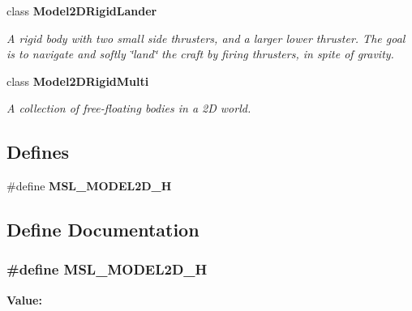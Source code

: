 \begin{CompactItemize}
class {\bf Model2DRigid\-Lander}
\begin{CompactList}\small\item\em A rigid body with two small side thrusters, and a larger lower thruster. The goal is to navigate and softly \char`\"{}land\char`\"{} the craft by firing thrusters, in spite of gravity.\item\end{CompactList}\item 
class {\bf Model2DRigid\-Multi}
\begin{CompactList}\small\item\em A collection of free-floating bodies in a 2D world.\item\end{CompactList}\end{CompactItemize}
\subsection*{Defines}
\begin{CompactItemize}
\item 
\#define {\bf MSL\_\-MODEL2D\_\-H}
\end{CompactItemize}


\subsection{Define Documentation}
\subsubsection{\setlength{\rightskip}{0pt plus 5cm}\#define MSL\_\-MODEL2D\_\-H}\label{model2d_8h_a0}


{\bf Value:}\footnotesize\begin{verbatim}
\end{verbatim}\normalsize 
